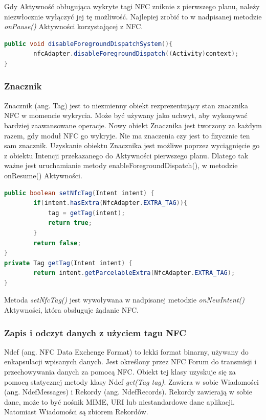 Gdy Aktywność obługująca wykryte tagi NFC zniknie z pierwszego planu, należy niezwłocznie wyłączyć jej tę możliwość. Najlepiej zrobić to w nadpisanej metodzie \textit{onPause()} Aktywności korzystającej z NFC. 
\begin{lstlisting}[language=Java]
public void disableForegroundDispatchSystem(){
        nfcAdapter.disableForegroundDispatch((Activity)context);
}
\end{lstlisting}
\subsubsection{Znacznik}
Znacznik (ang. Tag) jest to niezmienny obiekt rezprezentujący stan znacznika NFC w momencie wykrycia. Może być używany jako uchwyt, aby wykonywać bardziej zaawansowane operacje. Nowy obiekt Znacznika jest tworzony za każdym razem, gdy moduł NFC go wykryje. Nie ma znaczenia czy jest to fizycznie ten sam znacznik. Uzyskanie obiektu Znacznika jest możliwe poprzez wyciągnięcie go z obiektu Intencji przekazanego do Aktywności pierwszego planu. Dlatego tak ważne jest uruchamianie metody enableForegroundDispatch(), w metodzie onResume() Aktywności. 
\begin{lstlisting}[language=Java]
public boolean setNfcTag(Intent intent) {
        if(intent.hasExtra(NfcAdapter.EXTRA_TAG)){
            tag = getTag(intent);
            return true;
        }
        return false;
}
private Tag getTag(Intent intent) {
        return intent.getParcelableExtra(NfcAdapter.EXTRA_TAG);
}
\end{lstlisting}
Metoda \textit{setNfcTag()} jest wywoływana w nadpisanej metodzie \textit{onNewIntent()} Aktywności, która obsługuje żądanie NFC.
\subsubsection{Zapis i odczyt danych z użyciem tagu NFC}

Ndef (ang. NFC Data Exchenge Format) to lekki format binarny, używany do enkapsulacji wpisanych danych. Jest określony przez NFC Forum do transmisji i przechowywania danych za pomocą NFC. Obiekt tej klasy uzyskuje się za pomocą statycznej metody klasy Ndef \textit{get(Tag tag)}. Zawiera w sobie Wiadomości (ang. NdefMessages) i Rekordy (ang. NdefRecords). Rekordy zawierają w sobie dane, może to być nośnik MIME, URI lub niestandardowe dane aplikacji. Natomiast Wiadomości są zbiorem Rekordów.
